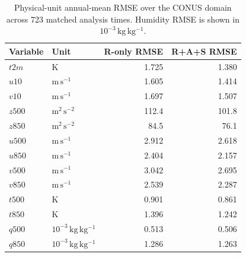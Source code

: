 \begin{table}[!htbp]
    \centering
    \caption{Physical-unit annual-mean RMSE over the CONUS domain across 723
    matched analysis times. Humidity RMSE is shown in
    $10^{-3}\,\mathrm{kg\,kg^{-1}}$.}
    \label{tab:absolute_rmse_full723}
    \small
    \renewcommand{\arraystretch}{1.10}
    \begin{tabular*}{\textwidth}{@{\extracolsep{\fill}}llrr@{}}
        \toprule
        Variable & Unit & R-only RMSE & R+A+S RMSE \\
        \midrule
        $t2m$ & $\mathrm{K}$ & 1.725 & 1.380 \\
        $u10$ & $\mathrm{m\,s^{-1}}$ & 1.605 & 1.414 \\
        $v10$ & $\mathrm{m\,s^{-1}}$ & 1.697 & 1.507 \\
        $z500$ & $\mathrm{m^2\,s^{-2}}$ & 112.4 & 101.8 \\
        $z850$ & $\mathrm{m^2\,s^{-2}}$ & 84.5 & 76.1 \\
        $u500$ & $\mathrm{m\,s^{-1}}$ & 2.912 & 2.618 \\
        $u850$ & $\mathrm{m\,s^{-1}}$ & 2.404 & 2.157 \\
        $v500$ & $\mathrm{m\,s^{-1}}$ & 3.042 & 2.695 \\
        $v850$ & $\mathrm{m\,s^{-1}}$ & 2.539 & 2.287 \\
        $t500$ & $\mathrm{K}$ & 0.901 & 0.861 \\
        $t850$ & $\mathrm{K}$ & 1.396 & 1.242 \\
        $q500$ & $10^{-3}\,\mathrm{kg\,kg^{-1}}$ & 0.513 & 0.506 \\
        $q850$ & $10^{-3}\,\mathrm{kg\,kg^{-1}}$ & 1.286 & 1.263 \\
        \bottomrule
    \end{tabular*}
\end{table}
